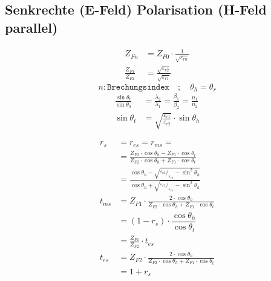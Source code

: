 \subsection{Senkrechte (E-Feld) Polarisation (H-Feld parallel)}


\begin{align*}
    Z_{Fn}                & = Z_{F0}\cdot\frac{1}{\sqrt{\varepsilon_{rn}}}            \\
    \frac{Z_{F1}}{Z_{F2}} & = \frac{\sqrt{\varepsilon_{r2}}}{\sqrt{\varepsilon_{r1}}}
\end{align*}
\[ n: \texttt{Brechungsindex} \quad ; \quad \theta_h = \theta_r\]
\begin{align*}
    \frac{\sin\theta_t}{\sin\theta_h} & = \frac{\lambda_2}{\lambda_1}= \frac{\beta_1}{\beta_2}= \frac{n_1}{n_2} \\
    \sin\theta_t                      & = \sqrt{\frac{\varepsilon_{r1}}{\varepsilon_{r2}}}\cdot \sin\theta_h
\end{align*}

\begin{align*}
    r_s    & =  r_{es} = r_{ms} =                                                                                                                                            \\
           & = \frac{Z_{F2} \cdot \cos \theta_h-Z_{F1} \cdot \cos \theta_t}{Z_{F2} \cdot \cos \theta_h+Z_{F1} \cdot \cos \theta_t}                                           \\
           & = \frac{\cos\theta_h-\sqrt{^{\varepsilon_{r2}}/_{\varepsilon_{r1}}-\sin^2\theta_h}}{\cos\theta_h+\sqrt{^{\varepsilon_{r2}}/_{\varepsilon_{r1}}-\sin^2\theta_h}} \\
    t_{ms} & = Z_{F1} \cdot \frac{2 \cdot \cos \theta_h}{Z_{F2} \cdot \cos \theta_h+Z_{F1} \cdot \cos \theta_t}                                                              \\
           & = (1 - r_s) \cdot \dfrac{\cos \theta_h}{\cos \theta_t}                                                                                                          \\
           & = \frac{Z_{F1}}{Z_{F2}}\cdot t_{es}                                                                                                                             \\
    t_{es} & = Z_{F2} \cdot \frac{2 \cdot \cos \theta_h}{Z_{F2} \cdot \cos \theta_h+Z_{F1} \cdot \cos \theta_t}                                                              \\
           & = 1+r_s
\end{align*}

